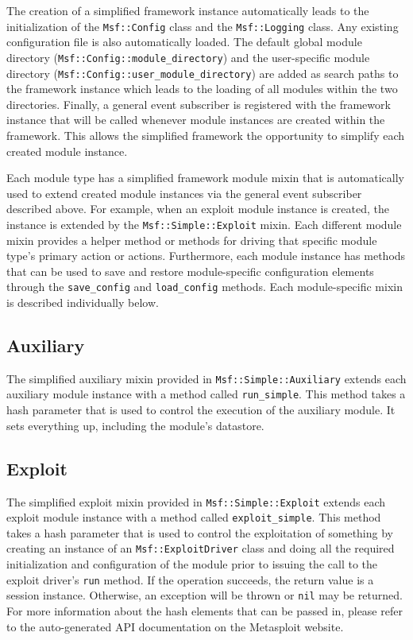 \documentclass{report}
\begin{document}
\par
The creation of a simplified framework instance automatically leads
to the initialization of the \texttt{Msf::Config} class and the
\texttt{Msf::Logging} class.  Any existing configuration file is
also automatically loaded.  The default global module directory
(\texttt{Msf::Config::module\_directory}) and the user-specific
module directory (\texttt{Msf::Config::user\_module\_directory}) are
added as search paths to the framework instance which leads to the
loading of all modules within the two directories.  Finally, a
general event subscriber is registered with the framework instance
that will be called whenever module instances are created within the
framework.  This allows the simplified framework the opportunity to
simplify each created module instance.

\par
Each module type has a simplified framework module mixin that is
automatically used to extend created module instances via the
general event subscriber described above.  For example, when an
exploit module instance is created, the instance is extended by the
\texttt{Msf::Simple::Exploit} mixin.  Each different module mixin
provides a helper method or methods for driving that specific module
type's primary action or actions.  Furthermore, each module instance
has methods that can be used to save and restore module-specific
configuration elements through the \texttt{save\_config} and
\texttt{load\_config} methods.  Each module-specific mixin is
described individually below.

			\subsection{Auxiliary}

\par
The simplified auxiliary mixin provided in \texttt{Msf::Simple::Auxiliary} 
extends each auxiliary module instance with a method called
\texttt{run\_simple}.  This method takes a hash parameter that is used to
control the execution of the auxiliary module.  It sets everything up,
including the module's datastore.

        \subsection{Exploit}

\par
The simplified exploit mixin provided in
\texttt{Msf::Simple::Exploit} extends each exploit module instance
with a method called \texttt{exploit\_simple}.  This method takes a
hash parameter that is used to control the exploitation of something
by creating an instance of an \texttt{Msf::ExploitDriver} class and
doing all the required initialization and configuration of the
module prior to issuing the call to the exploit driver's
\texttt{run} method.  If the operation succeeds, the return value is
a session instance.  Otherwise, an exception will be thrown or
\texttt{nil} may be returned. For more information about the hash
elements that can be passed in, please refer to the auto-generated
API documentation on the Metasploit website.
\end{document}
